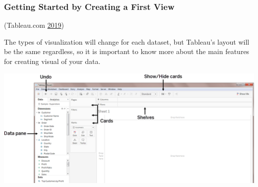 \documentclass[]{book}
\begin{document}
\hypertarget{getting-started-by-creating-a-first-view}{%
\subsubsection{Getting Started by Creating a First View}\label{getting-started-by-creating-a-first-view}}

(Tableau.com \protect\hyperlink{ref-Tableau_Build_Manual}{2019})

The types of visualization will change for each dataset, but Tableau's layout will be the same regardless, so it is important to know more about the main features for creating visual of your data.

\includegraphics{images/Drag28.png}
\end{document}
